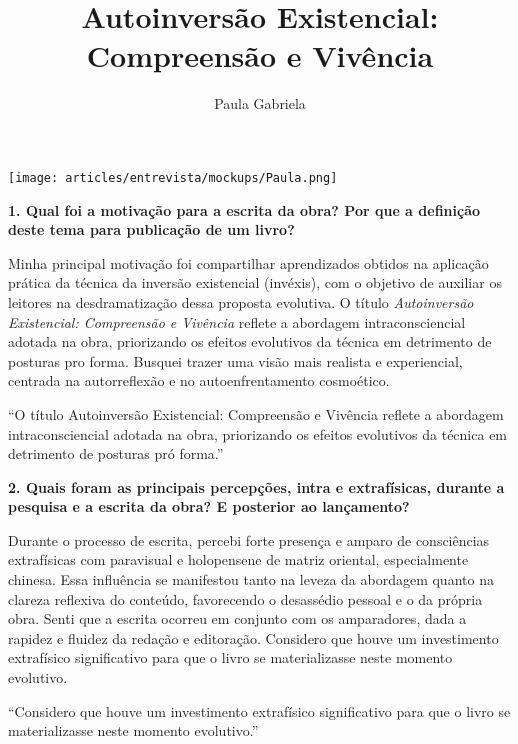 \documentclass{gescons}
\author{Paula Gabriela}
\title{Autoinversão Existencial: Compreensão e Vivência}
\begin{document}
    \makeentrevistatitle

    \begin{multicols}{2}



\begin{center}
    \texttt{[image: articles/entrevista/mockups/Paula.png]}
\end{center}


\textbf{1. Qual foi a motivação para a escrita da obra? Por que a definição deste tema para publicação de um livro?}

Minha principal motivação foi compartilhar aprendizados obtidos na aplicação prática da técnica da inversão existencial (invéxis), com o objetivo de auxiliar os leitores na desdramatização dessa proposta evolutiva. O título \textit{Autoinversão Existencial: Compreensão e Vivência} reflete a abordagem intraconsciencial adotada na obra, priorizando os efeitos evolutivos da técnica em detrimento de posturas pro forma. Busquei trazer uma visão mais realista e experiencial, centrada na autorreflexão e no autoenfrentamento cosmoético.

\begin{pullquote}
    ``O título Autoinversão Existencial: Compreensão e Vivência reflete a abordagem intraconsciencial adotada na obra, priorizando os efeitos evolutivos da técnica em detrimento de posturas pró forma.''
\end{pullquote}

\textbf{2. Quais foram as principais percepções, intra e extrafísicas, durante a pesquisa e a escrita da obra? E posterior ao lançamento?}

Durante o processo de escrita, percebi forte presença e amparo de consciências extrafísicas com paravisual e holopensene de matriz oriental, especialmente chinesa. Essa influência se manifestou tanto na leveza da abordagem quanto na clareza reflexiva do conteúdo, favorecendo o desassédio pessoal e o da própria obra. Senti que a escrita ocorreu em conjunto com os amparadores, dada a rapidez e fluidez da redação e editoração. Considero que houve um investimento extrafísico significativo para que o livro se materializasse neste momento evolutivo.

\begin{pullquote}
    ``Considero que houve um investimento extrafísico significativo para que o livro se materializasse neste momento evolutivo.''
\end{pullquote}


\end{multicols}
\end{document}
